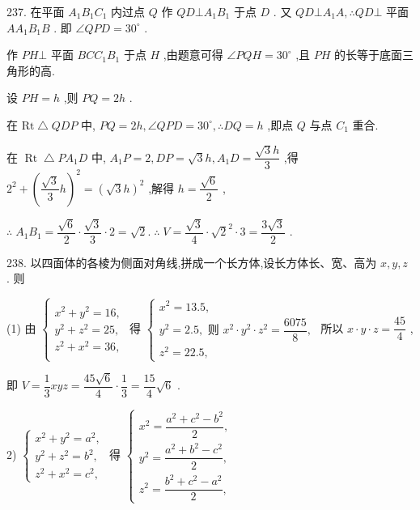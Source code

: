 237. 在平面 ${A}_{1}{B}_{1}{C}_{1}$ 内过点 $Q$ 作 ${QD} \bot  {A}_{1}{B}_{1}$ 于点 $D$ . 又 ${QD} \bot  {A}_{1}A,\therefore {QD} \bot$ 平面 $A{A}_{1}{B}_{1}B$ . 即 $\angle {QPD} = {30}^{ \circ  }$ .

作 ${PH} \bot$ 平面 ${BC}{C}_{1}{B}_{1}$ 于点 $H$ ,由题意可得 $\angle {PQH} = {30}^{ \circ  }$ ,且 ${PH}$ 的长等于底面三角形的高.

设 ${PH} = h$ ,则 ${PQ} = {2h}$ .

在 $\mathrm{{Rt}}\bigtriangleup {QDP}$ 中, ${PQ} = {2h},\angle {QPD} = {30}^{ \circ  },\therefore {DQ} = h$ ,即点 $Q$ 与点 ${C}_{1}$ 重合.

在 $\operatorname{Rt} \bigtriangleup  P{A}_{1}D$ 中, ${A}_{1}P = 2,{DP} = \sqrt{3}h,{A}_{1}D = \dfrac{\sqrt{3}h}{3}$ ,得 ${2}^{2} + {\left( \dfrac{\sqrt{3}}{3}h\right) }^{2} = {\left( \sqrt{3}h\right) }^{2}$ ,解得 $h = \dfrac{\sqrt{6}}{2}$ ,

$\therefore \;{A}_{1}{B}_{1} = \dfrac{\sqrt{6}}{2} \cdot  \dfrac{\sqrt{3}}{3} \cdot  2 = \sqrt{2}.\;\therefore \;V = \dfrac{\sqrt{3}}{4} \cdot  {\sqrt{2}}^{2} \cdot  3 = \dfrac{3\sqrt{3}}{2}$ .

238. 以四面体的各棱为侧面对角线,拼成一个长方体,设长方体长、宽、高为 $x,y,z$ . 则

(1) 由 $\left\{  {\begin{array}{l} {x}^{2} + {y}^{2} = {16}, \\  {y}^{2} + {z}^{2} = {25}, \\  {z}^{2} + {x}^{2} = {36}, \end{array}\text{ 得 }\left\{  \begin{array}{l} {x}^{2} = {13.5}, \\  {y}^{2} = {2.5},\text{ 则 }{x}^{2} \cdot  {y}^{2} \cdot  {z}^{2} = \dfrac{6075}{8}, \\  {z}^{2} = {22.5}, \end{array}\right. }\right.$ 所以 $x \cdot  y \cdot  z = \dfrac{45}{4}$ ,

即 $V = \dfrac{1}{3}{xyz} = \dfrac{{45}\sqrt{6}}{4} \cdot  \dfrac{1}{3} = \dfrac{15}{4}\sqrt{6}$ .

2) $\left\{  \begin{array}{l} {x}^{2} + {y}^{2} = {a}^{2}, \\  {y}^{2} + {z}^{2} = {b}^{2}, \\  {z}^{2} + {x}^{2} = {c}^{2}, \end{array}\right.$ 得 $\left\{  \begin{array}{l} {x}^{2} = \dfrac{{a}^{2} + {c}^{2} - {b}^{2}}{2}, \\  {y}^{2} = \dfrac{{a}^{2} + {b}^{2} - {c}^{2}}{2}, \\  {z}^{2} = \dfrac{{b}^{2} + {c}^{2} - {a}^{2}}{2}, \end{array}\right.$

